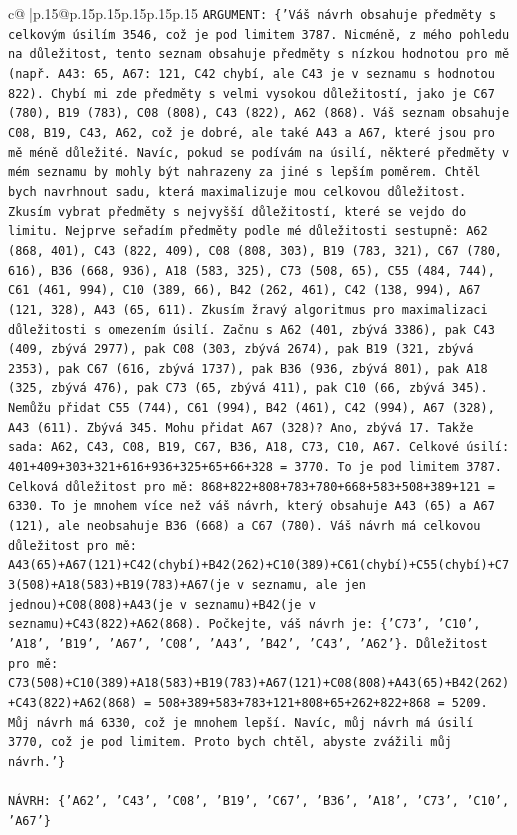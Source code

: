 \documentclass{article}
\begin{document}
{\begin{supertabular}{c@{$\;$}|p{.15\linewidth}@{}p{.15\linewidth}p{.15\linewidth}p{.15\linewidth}p{.15\linewidth}p{.15\linewidth}}
{{{                \texttt{ARGUMENT: \{'Váš návrh obsahuje předměty s celkovým úsilím 3546, což je pod limitem 3787. Nicméně, z mého pohledu na důležitost, tento seznam obsahuje předměty s nízkou hodnotou pro mě (např. A43: 65, A67: 121, C42 chybí, ale C43 je v seznamu s hodnotou 822). Chybí mi zde předměty s velmi vysokou důležitostí, jako je C67 (780), B19 (783), C08 (808), C43 (822), A62 (868). Váš seznam obsahuje C08, B19, C43, A62, což je dobré, ale také A43 a A67, které jsou pro mě méně důležité. Navíc, pokud se podívám na úsilí, některé předměty v mém seznamu by mohly být nahrazeny za jiné s lepším poměrem. Chtěl bych navrhnout sadu, která maximalizuje mou celkovou důležitost. Zkusím vybrat předměty s nejvyšší důležitostí, které se vejdo do limitu. Nejprve seřadím předměty podle mé důležitosti sestupně: A62 (868, 401), C43 (822, 409), C08 (808, 303), B19 (783, 321), C67 (780, 616), B36 (668, 936), A18 (583, 325), C73 (508, 65), C55 (484, 744), C61 (461, 994), C10 (389, 66), B42 (262, 461), C42 (138, 994), A67 (121, 328), A43 (65, 611). Zkusím žravý algoritmus pro maximalizaci důležitosti s omezením úsilí. Začnu s A62 (401, zbývá 3386), pak C43 (409, zbývá 2977), pak C08 (303, zbývá 2674), pak B19 (321, zbývá 2353), pak C67 (616, zbývá 1737), pak B36 (936, zbývá 801), pak A18 (325, zbývá 476), pak C73 (65, zbývá 411), pak C10 (66, zbývá 345). Nemůžu přidat C55 (744), C61 (994), B42 (461), C42 (994), A67 (328), A43 (611). Zbývá 345. Mohu přidat A67 (328)? Ano, zbývá 17. Takže sada: A62, C43, C08, B19, C67, B36, A18, C73, C10, A67. Celkové úsilí: 401+409+303+321+616+936+325+65+66+328 = 3770. To je pod limitem 3787. Celková důležitost pro mě: 868+822+808+783+780+668+583+508+389+121 = 6330. To je mnohem více než váš návrh, který obsahuje A43 (65) a A67 (121), ale neobsahuje B36 (668) a C67 (780). Váš návrh má celkovou důležitost pro mě: A43(65)+A67(121)+C42(chybí)+B42(262)+C10(389)+C61(chybí)+C55(chybí)+C73(508)+A18(583)+B19(783)+A67(je v seznamu, ale jen jednou)+C08(808)+A43(je v seznamu)+B42(je v seznamu)+C43(822)+A62(868). Počkejte, váš návrh je: \{'C73', 'C10', 'A18', 'B19', 'A67', 'C08', 'A43', 'B42', 'C43', 'A62'\}. Důležitost pro mě: C73(508)+C10(389)+A18(583)+B19(783)+A67(121)+C08(808)+A43(65)+B42(262)+C43(822)+A62(868) = 508+389+583+783+121+808+65+262+822+868 = 5209. Můj návrh má 6330, což je mnohem lepší. Navíc, můj návrh má úsilí 3770, což je pod limitem. Proto bych chtěl, abyste zvážili můj návrh.'\}} \\
\\ 
\texttt{NÁVRH: \{'A62', 'C43', 'C08', 'B19', 'C67', 'B36', 'A18', 'C73', 'C10', 'A67'\}} \\
            }
        }
    }
     \\ \\


\end{supertabular}}
\end{document}
